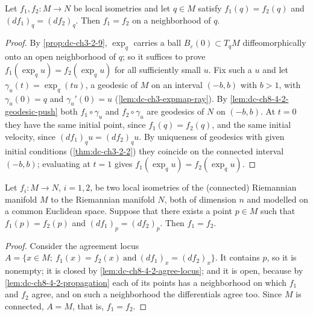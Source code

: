 \begin{lemma}
  \label{lem:dc-ch8-4-2-propagation}
  \leanok
  Let $f_1,f_2:M\to N$ be local isometries and let $q\in M$ satisfy $f_1(q)=f_2(q)$ and
  $(df_1)_q=(df_2)_q$. Then $f_1=f_2$ on a neighborhood of $q$.
\end{lemma}
\begin{proof}
  \leanok
\sketch
  By \cref{prop:dc-ch3-2-9}, $\exp_q$ carries a ball $B_\varepsilon(0)\subset T_qM$
  diffeomorphically onto an open neighborhood of $q$; so it suffices to prove
  $f_1(\exp_q u)=f_2(\exp_q u)$ for all sufficiently small $u$. Fix such a $u$ and let
  $\gamma_u(t)=\exp_q(tu)$, a geodesic of $M$ on an interval $(-b,b)$ with $b>1$, with
  $\gamma_u(0)=q$ and $\gamma_u'(0)=u$ (\cref{lem:dc-ch3-expmap-ray}). By
  \cref{lem:dc-ch8-4-2-geodesic-push} both $f_1\circ\gamma_u$ and $f_2\circ\gamma_u$ are
  geodesics of $N$ on $(-b,b)$. At $t=0$ they have the same initial point, since
  $f_1(q)=f_2(q)$, and the same initial velocity, since
  $(df_1)_q u=(df_2)_q u$. By uniqueness of geodesics with given initial conditions
  (\cref{thm:dc-ch3-2-2}) they coincide on the connected interval $(-b,b)$; evaluating
  at $t=1$ gives $f_1(\exp_q u)=f_2(\exp_q u)$.
\end{proof}

\begin{lemma}
  \label{lem:dc-ch8-4-2}
  \leanok
  Let $f_i:M\to N$, $i=1,2$, be two local isometries of the (connected) Riemannian
  manifold $M$ to the Riemannian manifold $N$, both of dimension $n$ and modelled on a
  common Euclidean space. Suppose that there exists a point $p\in M$ such that
  $f_1(p)=f_2(p)$ and $(df_1)_p=(df_2)_p$. Then $f_1=f_2$.
\end{lemma}
\begin{proof}
  \leanok
\sketch
  Consider the agreement locus
  $A=\{x\in M;\ f_1(x)=f_2(x)\ \text{and}\ (df_1)_x=(df_2)_x\}$. It contains $p$, so it
  is nonempty; it is closed by \cref{lem:dc-ch8-4-2-agree-locus}; and it is open,
  because by \cref{lem:dc-ch8-4-2-propagation} each of its points has a neighborhood on
  which $f_1$ and $f_2$ agree, and on such a neighborhood the differentials agree too.
  Since $M$ is connected, $A=M$, that is, $f_1=f_2$.
\end{proof}

